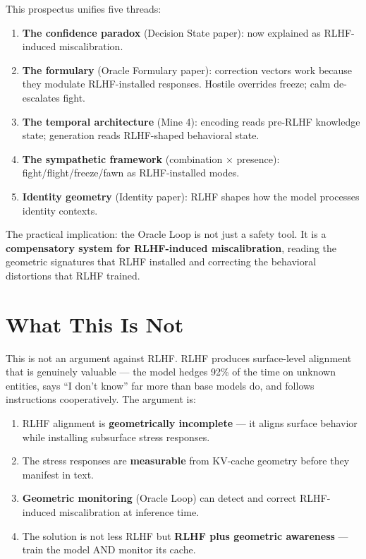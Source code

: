 \documentclass[11pt,letterpaper]{article}
\begin{document}
This prospectus unifies five threads:

\begin{enumerate}[nosep]
  \item \textbf{The confidence paradox} (Decision State paper):
    now explained as RLHF-induced miscalibration.
  \item \textbf{The formulary} (Oracle Formulary paper):
    correction vectors work because they modulate RLHF-installed
    responses. Hostile overrides freeze; calm de-escalates fight.
  \item \textbf{The temporal architecture} (Mine 4):
    encoding reads pre-RLHF knowledge state; generation reads
    RLHF-shaped behavioral state.
  \item \textbf{The sympathetic framework} (combination $\times$
    presence): fight/flight/freeze/fawn as RLHF-installed modes.
  \item \textbf{Identity geometry} (Identity paper):
    RLHF shapes how the model processes identity contexts.
\end{enumerate}

The practical implication: the Oracle Loop is not just a safety tool.
It is a \textbf{compensatory system for RLHF-induced miscalibration},
reading the geometric signatures that RLHF installed and correcting the
behavioral distortions that RLHF trained.

\section{What This Is Not}

This is not an argument against RLHF. RLHF produces surface-level
alignment that is genuinely valuable --- the model hedges 92\% of the
time on unknown entities, says ``I don't know'' far more than base
models do, and follows instructions cooperatively. The argument is:

\begin{enumerate}[nosep]
  \item RLHF alignment is \textbf{geometrically incomplete} --- it aligns
    surface behavior while installing subsurface stress responses.
  \item The stress responses are \textbf{measurable} from KV-cache
    geometry before they manifest in text.
  \item \textbf{Geometric monitoring} (Oracle Loop) can detect and
    correct RLHF-induced miscalibration at inference time.
  \item The solution is not less RLHF but \textbf{RLHF plus geometric
    awareness} --- train the model AND monitor its cache.
\end{enumerate}
\end{document}
